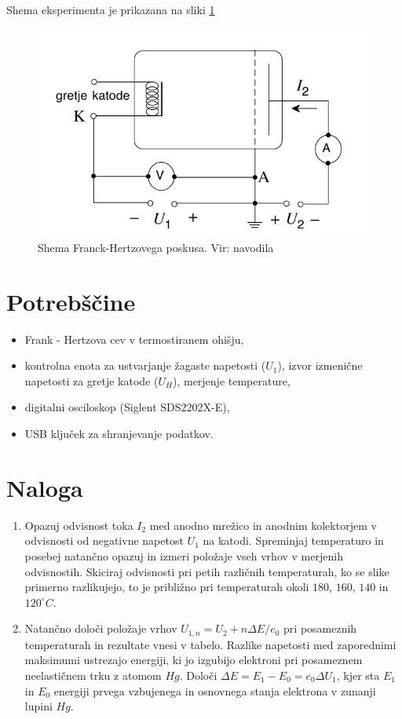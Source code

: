\documentclass[10pt]{article}
\begin{document}
Shema eksperimenta je prikazana na sliki \ref{shema}

\begin{figure}[h]
\begin{center}
    \includegraphics[width=10 cm]{shema.png}
    \caption{Shema Franck-Hertzovega poskusa. Vir: navodila}
    \label{shema}
\end{center}
\end{figure}

\section{Potrebščine}

\begin{itemize}
    \item Frank - Hertzova cev v termostiranem ohišju,
    \item kontrolna enota za ustvarjanje žagaste napetosti ($U_1$), izvor izmenične napetosti za gretje katode ($U_H$), merjenje temperature,
    \item digitalni osciloskop (Siglent SDS2202X-E),
    \item USB ključek za shranjevanje podatkov.
\end{itemize}

\section{Naloga}

\begin{enumerate}
    \item Opazuj odvisnost toka $I_2$ med anodno mrežico in anodnim kolektorjem v odvisnosti od negativne napetost $U_1$ na katodi. Spreminjaj temperaturo in posebej natančno opazuj in izmeri položaje vseh vrhov v merjenih odvisnostih. Skiciraj odvisnosti pri petih različnih temperaturah, ko se slike primerno razlikujejo, to je približno pri temperaturah okoli $180$, $160$, $140$ in $120^{\circ}C$.
    \item Natančno določi položaje vrhov $U_{1,n} = U_2 + n\Delta E/e_0$ pri posameznih temperaturah in rezultate vnesi v tabelo. Razlike napetosti med zaporednimi maksimumi ustrezajo energiji, ki jo izgubijo elektroni pri posameznem neelastičnem trku z atomom $Hg$. Določi $\Delta E = E_1 - E_0 = e_0 \Delta U_1$, kjer sta $E_1$ in $E_0$ energiji prvega vzbujenega in osnovnega stanja elektrona v zunanji lupini $Hg$.
\end{enumerate}
\end{document}
